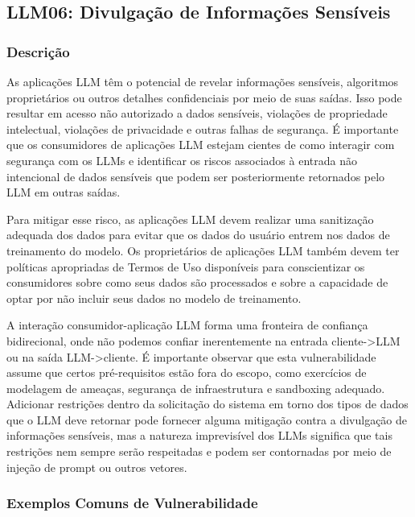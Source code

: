 \documentclass[
]{article}
\author{}
\date{}
\begin{document}
\subsection{LLM06: Divulgação de Informações
Sensíveis}\label{llm06-divulgauxe7uxe3o-de-informauxe7uxf5es-sensuxedveis}

\subsubsection{Descrição}\label{descriuxe7uxe3o}

As aplicações LLM têm o potencial de revelar informações sensíveis,
algoritmos proprietários ou outros detalhes confidenciais por meio de
suas saídas. Isso pode resultar em acesso não autorizado a dados
sensíveis, violações de propriedade intelectual, violações de
privacidade e outras falhas de segurança. É importante que os
consumidores de aplicações LLM estejam cientes de como interagir com
segurança com os LLMs e identificar os riscos associados à entrada não
intencional de dados sensíveis que podem ser posteriormente retornados
pelo LLM em outras saídas.

Para mitigar esse risco, as aplicações LLM devem realizar uma
sanitização adequada dos dados para evitar que os dados do usuário
entrem nos dados de treinamento do modelo. Os proprietários de
aplicações LLM também devem ter políticas apropriadas de Termos de Uso
disponíveis para conscientizar os consumidores sobre como seus dados são
processados e sobre a capacidade de optar por não incluir seus dados no
modelo de treinamento.

A interação consumidor-aplicação LLM forma uma fronteira de confiança
bidirecional, onde não podemos confiar inerentemente na entrada
cliente-\textgreater LLM ou na saída LLM-\textgreater cliente. É
importante observar que esta vulnerabilidade assume que certos
pré-requisitos estão fora do escopo, como exercícios de modelagem de
ameaças, segurança de infraestrutura e sandboxing adequado. Adicionar
restrições dentro da solicitação do sistema em torno dos tipos de dados
que o LLM deve retornar pode fornecer alguma mitigação contra a
divulgação de informações sensíveis, mas a natureza imprevisível dos
LLMs significa que tais restrições nem sempre serão respeitadas e podem
ser contornadas por meio de injeção de prompt ou outros vetores.

\subsubsection{Exemplos Comuns de
Vulnerabilidade}\label{exemplos-comuns-de-vulnerabilidade}
\end{document}
